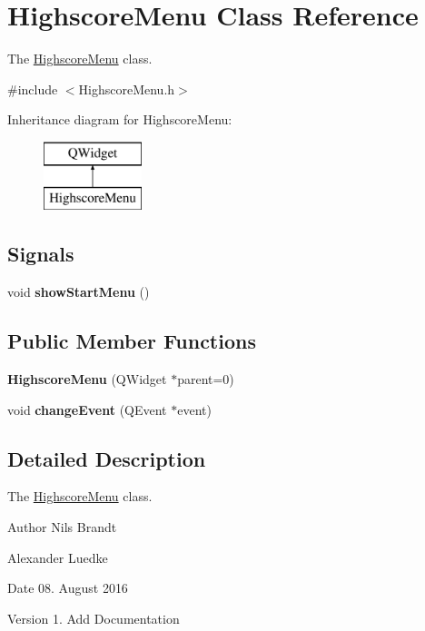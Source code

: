 \hypertarget{classHighscoreMenu}{\section{Highscore\-Menu Class Reference}
\label{classHighscoreMenu}
}


The \hyperlink{classHighscoreMenu}{Highscore\-Menu} class.  




{\ttfamily \#include $<$Highscore\-Menu.\-h$>$}

Inheritance diagram for Highscore\-Menu\-:\begin{figure}[H]
\begin{center}
\leavevmode
\includegraphics[height=2.000000cm]{classHighscoreMenu}
\end{center}
\end{figure}
\subsection*{Signals}
\begin{DoxyCompactItemize}
\item 
\hypertarget{classHighscoreMenu_acfc660f3078cc3e42a2b0be20f534e59}{void {\bfseries show\-Start\-Menu} ()}\label{classHighscoreMenu_acfc660f3078cc3e42a2b0be20f534e59}

\end{DoxyCompactItemize}
\subsection*{Public Member Functions}
\begin{DoxyCompactItemize}
\item 
\hypertarget{classHighscoreMenu_afffd6ba37985beae539f7d143de2201d}{{\bfseries Highscore\-Menu} (Q\-Widget $\ast$parent=0)}\label{classHighscoreMenu_afffd6ba37985beae539f7d143de2201d}

\item 
\hypertarget{classHighscoreMenu_ad71f69706ab1969e180abc4794f946c9}{void {\bfseries change\-Event} (Q\-Event $\ast$event)}\label{classHighscoreMenu_ad71f69706ab1969e180abc4794f946c9}

\end{DoxyCompactItemize}


\subsection{Detailed Description}
The \hyperlink{classHighscoreMenu}{Highscore\-Menu} class. 

\begin{DoxyAuthor}{Author}
Nils Brandt 

Alexander Luedke
\end{DoxyAuthor}
\begin{DoxyDate}{Date}
08. August 2016
\end{DoxyDate}
\begin{DoxyVersion}{Version}
1. Add Documentation 
\end{DoxyVersion}
